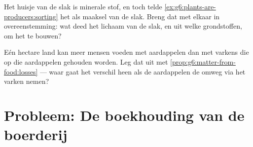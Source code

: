 \begin{exercise}[$\star\star$]\label{exo:g6:matter-from-food:11}
Het huisje van de slak is minerale stof, en toch telde
\cref{ex:g6:plants-are-producers:sorting} het als maaksel van de slak.
Breng dat met elkaar in overeenstemming: wat deed het lichaam van de
slak, en uit welke grondstoffen, om het te bouwen?
\end{exercise}

\begin{exercise}[$\star\star\star$]\label{exo:g6:matter-from-food:12}
Eén hectare land kan meer mensen voeden met aardappelen dan met varkens
die op die aardappelen gehouden worden. Leg dat uit met
\cref{prop:g6:matter-from-food:losses} --- waar gaat het verschil heen
als de aardappelen de omweg via het varken nemen?
\end{exercise}

\section{Probleem: De boekhouding van de boerderij}

